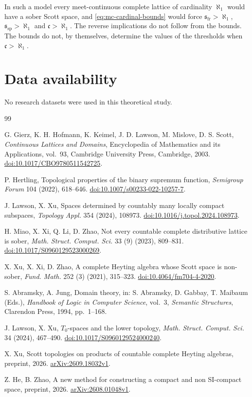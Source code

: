 \documentclass[preprint,11pt]{elsarticle}
\theoremstyle{definition}
\theoremstyle{remark}
\numberwithin{equation}{section}
\newcommand{\sfr}{\mathfrak{s}_{\mathrm{fr}}}
\newcommand{\ssp}{\mathfrak{s}_{\mathrm{sp}}}
\newcommand{\cc}{\mathfrak{c}}
\begin{document}
In such a model every meet-continuous complete lattice of cardinality $\aleph_1$ would have a sober Scott space, and \eqref{eq:mc-cardinal-bounds} would force $\sfr>\aleph_1$, $\ssp>\aleph_1$ and $\cc>\aleph_1$. The reverse implications do not follow from the bounds. The bounds do not, by themselves, determine the values of the thresholds when $\cc>\aleph_1$.

\section*{Data availability}
No research datasets were used in this theoretical study.



\begin{thebibliography}{99}
\raggedright
{}
G. Gierz, K. H. Hofmann, K. Keimel, J. D. Lawson, M. Mislove, D. S. Scott,
\emph{Continuous Lattices and Domains},
Encyclopedia of Mathematics and its Applications, vol.~93,
Cambridge University Press, Cambridge, 2003.
\href{https://doi.org/10.1017/CBO9780511542725}{doi:10.1017/CBO9780511542725}.

P. Hertling,
Topological properties of the binary supremum function,
\emph{Semigroup Forum} 104 (2022), 618--646.
\href{https://doi.org/10.1007/s00233-022-10257-7}{doi:10.1007/s00233-022-10257-7}.

J. Lawson, X. Xu,
Spaces determined by countably many locally compact subspaces,
\emph{Topology Appl.} 354 (2024), 108973.
\href{https://doi.org/10.1016/j.topol.2024.108973}{doi:10.1016/j.topol.2024.108973}.

H. Miao, X. Xi, Q. Li, D. Zhao,
Not every countable complete distributive lattice is sober,
\emph{Math. Struct. Comput. Sci.} 33 (9) (2023), 809--831.
\href{https://doi.org/10.1017/S0960129523000269}{doi:10.1017/S0960129523000269}.


X. Xu, X. Xi, D. Zhao,
A complete Heyting algebra whose Scott space is non-sober,
\emph{Fund. Math.} 252 (3) (2021), 315--323.
\href{https://doi.org/10.4064/fm704-4-2020}{doi:10.4064/fm704-4-2020}.

S. Abramsky, A. Jung,
Domain theory,
in: S. Abramsky, D. Gabbay, T. Maibaum (Eds.),
\emph{Handbook of Logic in Computer Science}, vol.~3,
\emph{Semantic Structures}, Clarendon Press, 1994, pp.~1--168.


J. Lawson, X. Xu,
$T_0$-spaces and the lower topology,
\emph{Math. Struct. Comput. Sci.} 34 (2024), 467--490.
\href{https://doi.org/10.1017/S0960129524000240}{doi:10.1017/S0960129524000240}.


X. Xu,
Scott topologies on products of countable complete Heyting algebras,
preprint, 2026.
\href{https://arxiv.org/abs/2609.18032v1}{arXiv:2609.18032v1}.

Z. He, B. Zhao,
A new method for constructing a compact and non SI-compact space,
preprint, 2026.
\href{https://arxiv.org/abs/2608.01048v1}{arXiv:2608.01048v1}.

\end{thebibliography}
\end{document}
